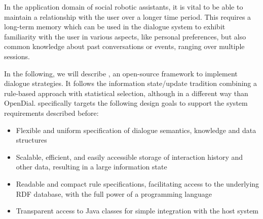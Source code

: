 In the application domain of social robotic assistants, it is vital to be able
to maintain a relationship with the user over a longer time period. This requires a long-term
memory which can be used in the dialogue system to exhibit familiarity with the
user in various aspects, like personal preferences, but also common knowledge
about past conversations or events, ranging over multiple sessions.

In the following, we will describe \vonda, an open-source framework to
implement dialogue strategies. It follows the information state/update
tradition \citep{traum2003information}
combining a rule-based approach with statistical selection, although in a
different way than OpenDial. \vonda specifically targets the following design
goals to support the system requirements described before:

\begin{itemize}
  \addtolength{\itemsep}{-.6\itemsep}
\item Flexible and uniform specification of dialogue semantics, knowledge and
  data structures
\item Scalable, efficient, and easily accessible storage of interaction history
  and other data, resulting in a large information state
\item Readable and compact rule specifications, facilitating access to the
  underlying RDF database, with the full power of a programming language
\item Transparent access to Java classes for simple integration with the host
  system
\end{itemize}
\fi

